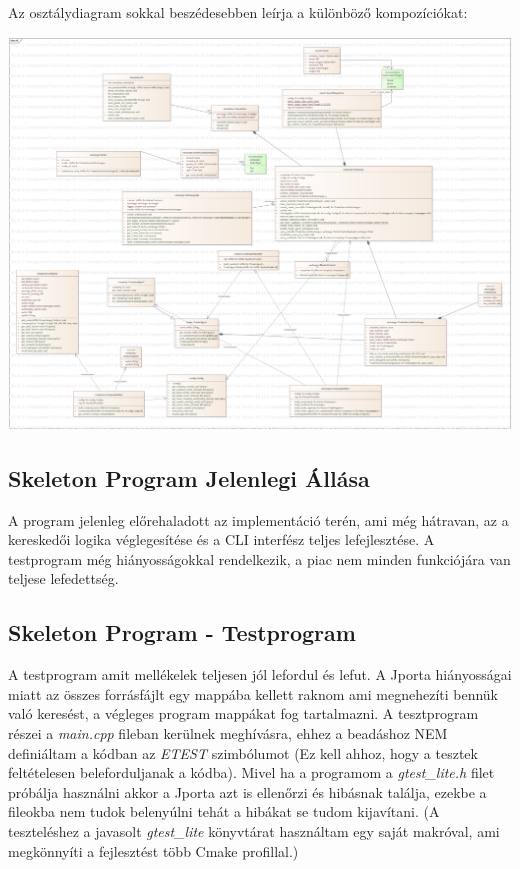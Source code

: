 \documentclass{article}[12pt,a4paper]
\begin{document}
    Az osztálydiagram sokkal beszédesebben leírja a különböző kompozíciókat:
    \begin{center}
        \includegraphics[scale=0.20]{cli}
    \end{center}

    \subsection{Skeleton Program Jelenlegi Állása}
    A program jelenleg előrehaladott az implementáció terén, ami még hátravan, az a kereskedői logika véglegesítése és a CLI interfész teljes lefejlesztése.
    A testprogram még hiányosságokkal rendelkezik, a piac nem minden funkciójára van teljese lefedettség.

    \subsection{Skeleton Program - Testprogram}
    A testprogram amit mellékelek teljesen jól lefordul és lefut.
    A Jporta hiányosságai miatt az összes forrásfájlt egy mappába kellett raknom ami megnehezíti bennük való keresést, a végleges program mappákat fog tartalmazni.
    A tesztprogram részei a \textit{main.cpp} fileban kerülnek meghívásra, ehhez a beadáshoz NEM definiáltam a kódban az \textit{ETEST} szimbólumot (Ez kell ahhoz, hogy a tesztek feltételesen beleforduljanak a kódba).
    Mivel ha a programom a \textit{gtest\_lite.h} filet próbálja használni akkor a Jporta azt is ellenőrzi és hibásnak találja, ezekbe a fileokba nem tudok belenyúlni tehát a hibákat se tudom kijavítani.
    (A teszteléshez a javasolt \textit{gtest\_lite} könyvtárat használtam egy saját makróval, ami megkönnyíti a fejlesztést több Cmake profillal.)
\end{document}

